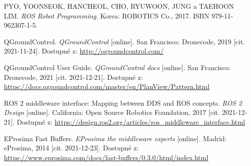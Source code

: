 \begin{thebibliography}{99}
PYO, YOONSEOK, HANCHEOL, CHO, RYUWOON, JUNG a TAEHOON LIM. \textit{ROS Robot Programming}. Korea: ROBOTICS Co., 2017. ISBN 979-11-962307-1-5.



QGroundControl. \textit{QGroundControl} [online]. San Francisco: Dronecode, 2019 [cit. 2021-11-24]. Dostupné z: \href{http://qgroundcontrol.com/}{http://qgroundcontrol.com/}

QGroundControl User Guide. \textit{QGroundControl docs} [online]. San Francisco: Dronecode, 2021 [cit. 2021-12-21]. Dostupné z: \href{https://docs.qgroundcontrol.com/master/en/PlanView/Pattern.html}{https://docs.qgroundcontrol.com/master/en/PlanView/Pattern.html}

ROS 2 middleware interface: Mapping between DDS and ROS concepts. \textit{ROS 2 Design} [online]. California: Open Source Robotics Foundation, 2017 [cit. 2021-12-21]. Dostupné z: \href{https://design.ros2.org/articles/ros\_middleware\_interface.html}{https://design.ros2.org/articles/ros\_middleware\_interface.html}




EProsima Fast Buffers. \textit{EProsima the middleware experts} [online]. Madrid: eProsima, 2014 [cit. 2021-12-23]. Dostupné z: \href{https://www.eprosima.com/docs/fast-buffers/0.3.0/html/index.html}{https://www.eprosima.com/docs/fast-buffers/0.3.0/html/index.html}


\end{thebibliography}
